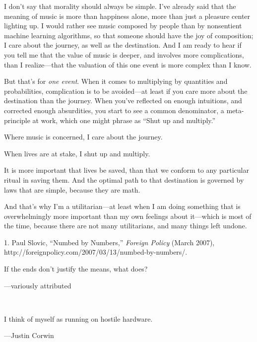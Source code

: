 {
 I don't say that morality should always be simple.
I've already said that the meaning of music is more
than happiness alone, more than just a pleasure center lighting up. I
would rather see music composed by people than by nonsentient machine
learning algorithms, so that someone should have the joy of
composition; I care about the journey, as well as the destination. And
I am ready to hear if you tell me that the value of music is deeper,
and involves more complications, than I realize---that the valuation of
this one event is more complex than I know.}

{
 But that's for \textit{one event}. When it comes
to multiplying by quantities and probabilities, complication is to be
avoided---at least if you care more about the destination than the
journey. When you've reflected on enough intuitions,
and corrected enough absurdities, you start to see a common
denominator, a meta-principle at work, which one might phrase as
``Shut up and multiply.''}

{
 Where music is concerned, I care about the journey.}

{
 When lives are at stake, I shut up and multiply.}

{
 It is more important that lives be saved, than that we conform to
any particular ritual in saving them. And the optimal path to that
destination is governed by laws that are simple, because they are
math.}

{
 And that's why I'm a
utilitarian---at least when I am doing something that is overwhelmingly
more important than my own feelings about it---which is most of the
time, because there are not many utilitarians, and many things left
undone.}

\myendsectiontext


\bigskip

{
 1. Paul Slovic, ``Numbed by
Numbers,'' \textit{Foreign Policy} (March 2007),
http://foreignpolicy.com/2007/03/13/numbed-by-numbers/.}


{
 If the ends don't justify the means, what does?}

{\raggedleft
 {}---variously attributed
\par}


\bigskip

{
 ~}

{
 I think of myself as running on hostile hardware.}

{\raggedleft
 {}---Justin Corwin
\par}


